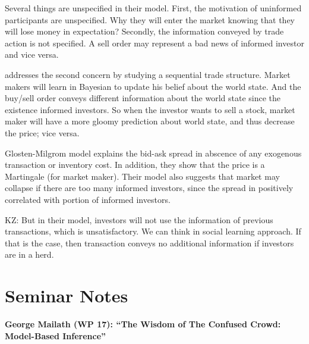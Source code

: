 \documentclass{book}
\theoremstyle{plain}
\theoremstyle{definition}
\begin{document}
Several things are unspecified in their model.
First, the motivation of uninformed participants are unspecified. Why they will enter the market knowing that they will lose money in expectation?
Secondly, the information conveyed by trade action is not specified.
A sell order may represent a bad news of informed investor and vice versa. 

\vspace{1em}
\cite{glosten_milgrom:1985bid} addresses the second concern by studying a sequential trade structure.
Market makers will learn in Bayesian to update his belief about the world state. 
And the buy/sell order conveys different information about the world state since the existence informed investors.
So when the investor wants to sell a stock, market maker will have a more gloomy prediction about world state, and thus decrease the price; vice versa.

Glosten-Milgrom model explains the bid-ask spread in abscence of any exogenous transaction or inventory cost.
In addition, they show that the price is a Martingale (for market maker).
Their model also suggests that market may collapse if there are too many informed investors, since the spread in positively correlated with portion of informed investors. 

KZ: But in their model, investors will not use the information of previous transactions, which is unsatisfactory.
We can think in social learning approach.
If that is the case, then transaction conveys no additional information if investors are in a herd.



\section{Seminar Notes} %
\label{sec:seminar_notes}

\noindent
\textbf{George Mailath (WP 17): “The Wisdom of The Confused Crowd: Model-Based Inference”}\\
\end{document}
